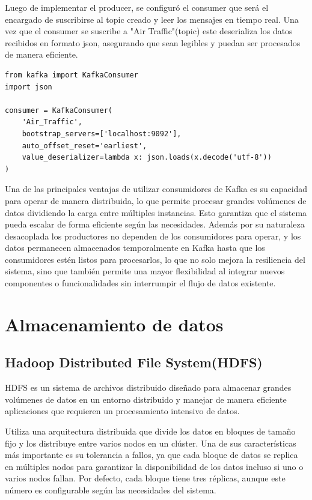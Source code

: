 \documentclass{article}
\begin{document}
Luego de implementar el producer, se configuró el consumer que será el encargado de suscribirse al topic creado y leer los mensajes en tiempo real. Una vez que el consumer se suscribe a "Air Traffic"(topic) este deserializa los datos recibidos en formato json, asegurando que sean legibles y puedan ser procesados de manera eficiente.

\begin{lstlisting}[style=python]
from kafka import KafkaConsumer
import json

consumer = KafkaConsumer(
    'Air_Traffic',
    bootstrap_servers=['localhost:9092'],
    auto_offset_reset='earliest',
    value_deserializer=lambda x: json.loads(x.decode('utf-8'))
)
\end{lstlisting}

Una de las principales ventajas de utilizar consumidores de Kafka es su capacidad para operar de manera distribuida, lo que permite procesar grandes volúmenes de datos dividiendo la carga entre múltiples instancias. Esto garantiza que el sistema pueda escalar de forma eficiente según las necesidades.
Además por su naturaleza desacoplada los productores no dependen de los consumidores para operar, y los datos permanecen almacenados temporalmente en Kafka hasta que los consumidores estén listos para procesarlos, lo que no solo mejora la resiliencia del sistema, sino que también permite una mayor flexibilidad al integrar nuevos componentes o funcionalidades sin interrumpir el flujo de datos existente.

\section{Almacenamiento de datos}

\subsection{Hadoop Distributed File System(HDFS)}

HDFS es un sistema de archivos distribuido diseñado para almacenar grandes volúmenes de datos en un entorno distribuido y manejar de manera eficiente aplicaciones que requieren un procesamiento intensivo de datos.\cite{HadoopHDFS}

Utiliza una arquitectura distribuida que divide los datos en bloques de tamaño fijo y los distribuye entre varios nodos en un clúster. Una de sus características más importante es su  tolerancia a fallos, ya que cada bloque de datos se replica en múltiples nodos para garantizar la disponibilidad de los datos incluso si uno o varios nodos fallan. Por defecto, cada bloque tiene tres réplicas, aunque este número es configurable según las necesidades del sistema.
\end{document}
